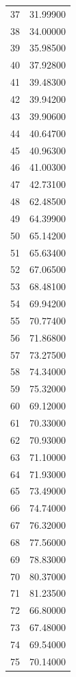 \documentclass[
  letterpaper,
  DIV=11,
  numbers=noendperiod]{scrreprt}
\begin{document}
\begin{tcolorbox}
\begin{tabular}{lr}
37   &         31.99900 \\
38   &         34.00000 \\
39   &         35.98500 \\
40   &         37.92800 \\
41   &         39.48300 \\
42   &         39.94200 \\
43   &         39.90600 \\
44   &         40.64700 \\
45   &         40.96300 \\
46   &         41.00300 \\
47   &         42.73100 \\
48   &         62.48500 \\
49   &         64.39900 \\
50   &         65.14200 \\
51   &         65.63400 \\
52   &         67.06500 \\
53   &         68.48100 \\
54   &         69.94200 \\
55   &         70.77400 \\
56   &         71.86800 \\
57   &         73.27500 \\
58   &         74.34000 \\
59   &         75.32000 \\
60   &         69.12000 \\
61   &         70.33000 \\
62   &         70.93000 \\
63   &         71.10000 \\
64   &         71.93000 \\
65   &         73.49000 \\
66   &         74.74000 \\
67   &         76.32000 \\
68   &         77.56000 \\
69   &         78.83000 \\
70   &         80.37000 \\
71   &         81.23500 \\
72   &         66.80000 \\
73   &         67.48000 \\
74   &         69.54000 \\
75   &         70.14000 \\

\end{tabular}
\end{tcolorbox}
\end{document}
